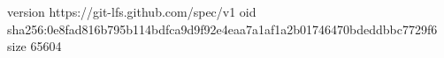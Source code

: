 version https://git-lfs.github.com/spec/v1
oid sha256:0e8fad816b795b114bdfca9d9f92e4eaa7a1af1a2b01746470bdeddbbc7729f6
size 65604
